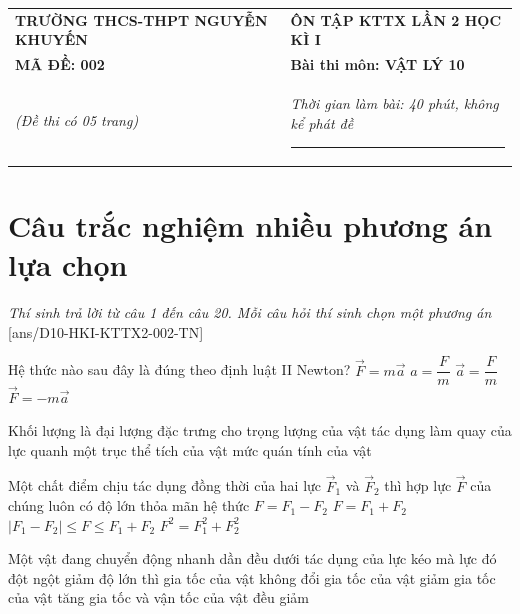 \begin{center}
	\begin{tabular}{M{9.25cm}M{8.75cm}}
		\textbf{TRƯỜNG THCS-THPT NGUYỄN KHUYẾN}& \textbf{ÔN TẬP KTTX LẦN 2 HỌC KÌ I}\\
		\textbf{MÃ ĐỀ: 002}& \textbf{Bài thi môn: VẬT LÝ 10}\\
		\textit{(Đề thi có 05 trang)}& \textit{Thời gian làm bài: 40 phút, không kể phát đề}
		
		\noindent\rule{4cm}{0.8pt} \\
	\end{tabular}
\end{center}
\setcounter{section}{0}
\section{Câu trắc nghiệm nhiều phương án lựa chọn}
\textit{Thí sinh trả lời từ câu 1 đến câu 20. Mỗi câu hỏi thí sinh chọn một phương án}
\setcounter{ex}{0}
[ans/D10-HKI-KTTX2-002-TN]
\begin{ex}
	Hệ thức nào sau đây là đúng theo định luật II Newton?
	\choice
	{\True $\vec{F}=m\vec{a}$}
	{$a=\dfrac{F}{m}$}
	{$\vec{a}=\dfrac{F}{m}$}
	{$\vec{F}=-m\vec{a}$}
	\loigiai{}
\end{ex}
\begin{ex}
	Khối lượng là đại lượng đặc trưng cho
	\choice
	{trọng lượng của vật}
	{tác dụng làm quay của lực quanh một trục}
	{thể tích của vật}
	{\True mức quán tính của vật}
	\loigiai{}
\end{ex}
\begin{ex}
Một chất điểm chịu tác dụng đồng thời của hai lực $\vec{F}_1$ và $\vec{F}_2$ thì hợp lực $\vec{F}$ của chúng luôn có độ lớn thỏa mãn hệ thức	
	\choice
	{$F=F_1-F_2$}
	{$F=F_1+F_2$}
	{\True $\left|F_1-F_2\right|\le F\le F_1+F_2$}
	{$F^2=F^2_1+F^2_2$}
	\loigiai{}
\end{ex}
\begin{ex}
	Một vật đang chuyển động nhanh dần đều dưới tác dụng của lực kéo mà lực đó đột ngột giảm độ lớn thì
	\choice
	{gia tốc của vật không đổi}
	{\True gia tốc của vật giảm}
	{gia tốc của vật tăng}
	{gia tốc và vận tốc của vật đều giảm}
	\loigiai{}
\end{ex}
